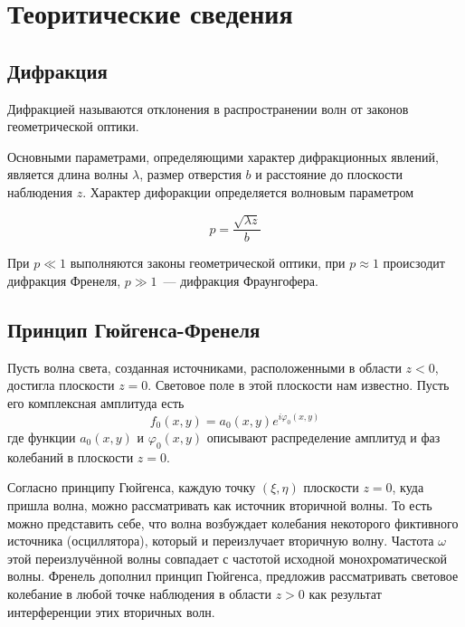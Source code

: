 \section{Теоритические сведения}
\subsection{Дифракция}
Дифракцией называются отклонения в распространении волн от законов геометрической оптики.

Основными параметрами, определяющими характер дифракционных явлений, является длина волны $\lambda$, размер отверстия $b$ и расстояние до плоскости наблюдения $z$. Характер дифоракции определяется волновым параметром

\[
    p = \frac{\sqrt{\lambda z}}{b}
\]

При $p \ll 1$ выполняются законы геометрической оптики, при $p\approx 1$ происзодит дифракция Френеля, $p\gg 1$~--- дифракция Фраунгофера.

\subsection{Принцип Гюйгенса-Френеля}
\begin{figure}[ht!]
\end{figure}

Пусть волна света, созданная источниками, расположенными в области $z < 0$, достигла плоскости $z=0$. Световое поле в этой плоскости нам известно. Пусть его комплексная амплитуда есть
\[
    f_{0}(x, y) = a_{0}(x, y)e^{i \varphi_{0}(x, y)}
\]
где функции $a_{0}(x, y)$ и $ \varphi_{0}(x, y)$ описывают распределение амплитуд и фаз колебаний в плоскости $z=0$.

Согласно принципу Гюйгенса, каждую точку $( \xi, \eta)$ плоскости $z = 0$, куда пришла волна, можно рассматривать  как источник вторичной волны. То есть можно представить себе, что волна возбуждает колебания некоторого фиктивного источника (осциллятора), который и переизлучает вторичную волну. Частота $ \omega$ этой переизлучённой волны совпадает с частотой исходной монохроматической волны. Френель дополнил принцип Гюйгенса, предложив рассматривать световое колебание в любой точке наблюдения в области $z > 0$ как результат интерференции этих вторичных волн.

